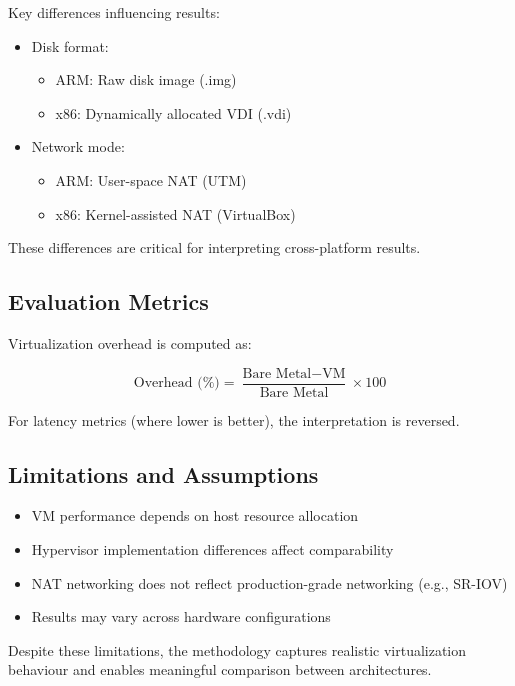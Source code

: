 \documentclass[conference]{IEEEtran}
\begin{document}
Key differences influencing results:

\begin{itemize}
    \item Disk format:
    \begin{itemize}
        \item ARM: Raw disk image (.img)
        \item x86: Dynamically allocated VDI (.vdi)
    \end{itemize}
    
    \item Network mode:
    \begin{itemize}
        \item ARM: User-space NAT (UTM)
        \item x86: Kernel-assisted NAT (VirtualBox)
    \end{itemize}
\end{itemize}

These differences are critical for interpreting cross-platform results.

\subsection{Evaluation Metrics}

Virtualization overhead is computed as:

\begin{equation}
\text{Overhead (\%)} = \frac{\text{Bare Metal} - \text{VM}}{\text{Bare Metal}} \times 100
\end{equation}

For latency metrics (where lower is better), the interpretation is reversed.

\subsection{Limitations and Assumptions}

\begin{itemize}
    \item VM performance depends on host resource allocation
    \item Hypervisor implementation differences affect comparability
    \item NAT networking does not reflect production-grade networking (e.g., SR-IOV)
    \item Results may vary across hardware configurations
\end{itemize}

Despite these limitations, the methodology captures realistic virtualization behaviour and enables meaningful comparison between architectures.
\end{document}
